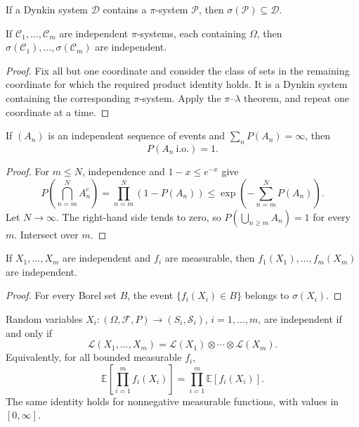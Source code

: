 \begin{thm}
If a Dynkin system $\mathcal D$ contains a $\pi$-system $\mathcal P$, then
$\sigma(\mathcal P)\subseteq\mathcal D$.
\end{thm}

\begin{cor}
If $\mathcal C_1,\ldots,\mathcal C_m$ are independent $\pi$-systems, each
containing $\Omega$, then
$\sigma(\mathcal C_1),\ldots,\sigma(\mathcal C_m)$ are independent.
\end{cor}

\begin{proof}
Fix all but one coordinate and consider the class of sets in the remaining
coordinate for which the required product identity holds. It is a Dynkin
system containing the corresponding $\pi$-system. Apply the
$\pi$--$\lambda$ theorem, and repeat one coordinate at a time.
\end{proof}

\begin{lem}
If $(A_n)$ is an independent sequence of events and
$\sum_nP(A_n)=\infty$, then
\[
P(A_n\ \mathrm{i.o.})=1.
\]
\end{lem}

\begin{proof}
For $m\leq N$, independence and $1-x\leq e^{-x}$ give
\[
P\!\left(\bigcap_{n=m}^{N}A_n^c\right)
 =\prod_{n=m}^{N}(1-P(A_n))
 \leq\exp\!\left(-\sum_{n=m}^{N}P(A_n)\right).
\]
Let $N\to\infty$. The right-hand side tends to zero, so
$P(\bigcup_{n\geq m}A_n)=1$ for every $m$. Intersect over $m$.
\end{proof}

\begin{prop}
If $X_1,\ldots,X_m$ are independent and $f_i$ are measurable, then
$f_1(X_1),\ldots,f_m(X_m)$ are independent.
\end{prop}

\begin{proof}
For every Borel set $B$, the event
$\{f_i(X_i)\in B\}$ belongs to $\sigma(X_i)$.
\end{proof}

\begin{thm}
Random variables $X_i:(\Omega,\mathcal F,P)\to(S_i,\mathcal S_i)$,
$i=1,\ldots,m$, are independent if and only if
\[
\mathcal L(X_1,\ldots,X_m)
 =\mathcal L(X_1)\otimes\cdots\otimes\mathcal L(X_m).
\]
Equivalently, for all bounded measurable $f_i$,
\[
\mathbb E\!\left[\prod_{i=1}^{m}f_i(X_i)\right]
 =\prod_{i=1}^{m}\mathbb E[f_i(X_i)].
\]
The same identity holds for nonnegative measurable functions, with values in
$[0,\infty]$.
\end{thm}

